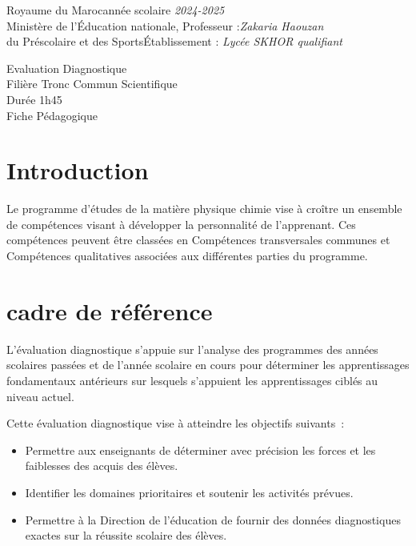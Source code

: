 \documentclass[12pt]{article}
\newcommand\headerMe[2]{\noindent{}#1\hfill#2}
\begin{document}
\headerMe{Royaume du Maroc}{année scolaire \emph{2024-2025}}\\
\headerMe{Ministère de l'Éducation nationale, }{  Professeur :\emph{Zakaria Haouzan}}\\
\headerMe{du Préscolaire et des Sports}{Établissement : \emph{Lycée SKHOR qualifiant}}\\

\begin{center}
Evaluation Diagnostique \\
Filière Tronc Commun Scientifique\\
Durée 1h45
\\
    \vspace{.2cm}
\hrulefill
\Large{Fiche Pédagogique}
\hrulefill\\
\end{center}


\section[A]{Introduction }
\hspace{0.5cm}Le programme d'études de la matière physique chimie vise à croître un ensemble de compétences visant à développer la personnalité de l'apprenant. Ces compétences peuvent être classées en Compétences transversales communes et Compétences qualitatives associées aux différentes parties du programme.
\section{cadre de référence }
 \hspace{0.5cm}
L'évaluation diagnostique s'appuie sur l'analyse des programmes des années scolaires passées et de l'année scolaire en cours pour déterminer les apprentissages fondamentaux antérieurs sur lesquels s'appuient les apprentissages ciblés au niveau actuel.

Cette évaluation diagnostique vise à atteindre les objectifs suivants :
\begin{itemize}
	\item Permettre aux enseignants de déterminer avec précision les forces et les faiblesses des acquis des élèves.
	\item Identifier les domaines prioritaires et soutenir les activités prévues.
	\item Permettre à la Direction de l'éducation de fournir des données diagnostiques exactes sur la réussite scolaire des élèves.
\end{itemize}
\end{document}
